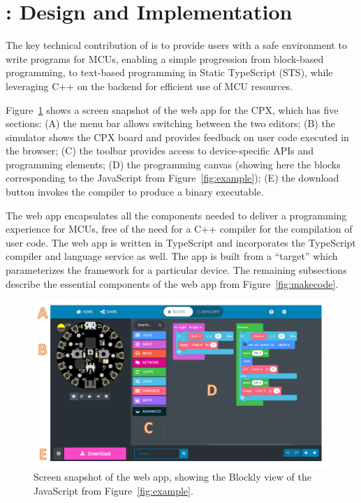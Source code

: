 \section{\MCN: Design and Implementation}
\label{sec:makecode}
The key technical contribution of \MC is to provide users with a safe environment to write programs for MCUs, enabling a simple progression from block-based
programming, to text-based programming in Static TypeScript (STS), 
while leveraging C++ on the backend for efficient use of MCU resources.

Figure~\ref{fig:screenSnap} shows a screen snapshot of the \MC web app for the CPX,
which has five sections:
(A) the menu bar allows switching between the two editors;
(B) the simulator shows the CPX board and provides feedback on user code executed in the browser;
(C) the toolbar provides access to device-specific APIs and programming elements;
(D) the programming canvas (showing here the blocks corresponding to the JavaScript from Figure~\ref{fig:example});
(E) the download button invokes the compiler to produce a binary executable.

The web app encapsulates all the components needed to deliver a programming experience
for MCUs, free of the need for a C++ compiler for the compilation of user code.
The web app is written in TypeScript and incorporates the TypeScript compiler and
language service as well.
The app is built from a \MC ``target''
which parameterizes the \MC framework for a particular device.
The remaining subsections describe the essential components of the web app 
from Figure~\ref{fig:makecode}.


\begin{figure}[t]
    \includegraphics[width=6in]{CPXfig.pdf}
\caption{\label{fig:screenSnap}Screen snapshot of the \MC web app, showing the Blockly
view of the JavaScript from Figure~\ref{fig:example}.}
\end{figure}


